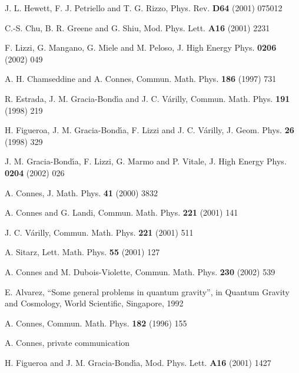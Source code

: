 \documentclass[a4paper,12pt]{article}
\newcommand{\1}{\mathbf{1}}         %
\newcommand{\7}{\dagger}            %
\newcommand{\8}{\bullet}            %
\renewcommand{\.}{\cdot}            %
\renewcommand{\:}{\colon}           %
\begin{document}
\begin{thebibliography}{92}
J. L. Hewett, F. J. Petriello and T. G. Rizzo,
Phys. Rev. {\bf D64} (2001) 075012

C.-S. Chu, B. R. Greene and G. Shiu,
Mod. Phys. Lett. {\bf A16} (2001) 2231

F. Lizzi, G. Mangano, G. Miele and M. Peloso,
J. High Energy Phys. {\bf 0206} (2002) 049

A. H. Chamseddine and A. Connes,
Commun. Math. Phys. {\bf 186} (1997) 731

R. Estrada, J. M. Gracia-Bond\'{\i}a and J. C. V\'arilly,
Commun. Math. Phys. {\bf 191} (1998) 219

H. Figueroa, J. M. Gracia-Bond\'{\i}a, F. Lizzi and J. C. V\'arilly,
J. Geom. Phys. {\bf 26} (1998) 329

J. M. Gracia-Bond\'{\i}a, F. Lizzi, G. Marmo and P. Vitale,
J. High Energy Phys. {\bf 0204} (2002) 026

A. Connes,
J. Math. Phys. {\bf 41} (2000) 3832

A. Connes and G. Landi,
Commun. Math. Phys. {\bf 221} (2001) 141

J. C. V\'arilly,
Commun. Math. Phys. {\bf 221} (2001) 511

A. Sitarz,
Lett. Math. Phys. {\bf 55} (2001) 127

A. Connes and M. Dubois-Violette,
Commun. Math. Phys. {\bf 230} (2002) 539

E. Alvarez,
``Some general problems in quantum gravity'',
in Quantum Gravity and Cosmology,
World Scientific, Singapore, 1992

A. Connes,
Commun. Math. Phys. {\bf 182} (1996) 155

A. Connes, private communication

H. Figueroa and J. M. Gracia-Bond\'{\i}a,
Mod. Phys. Lett. {\bf A16} (2001) 1427


\end{thebibliography}
\end{document}
